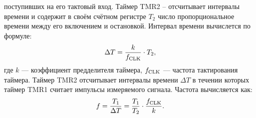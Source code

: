 \documentclass[12pt,a4paper]{article}
\newcommand{\ds}{\displaystyle}
\begin{document}
	поступивших на его тактовый вход. 
	Таймер TMR2 -- отсчитывает интервалы времени и содержит в
	своём счётном регистре $T_2$ число пропорциональное 
	времени между его включением и остановкой. 
	Интервал времени вычислется по формуле: \\
	\begin{equation} 
		\ds \Delta T = \frac{k}{f_{\rm CLK}}\cdot T_2,
	\end{equation}
	где $k$ --- коэффициент предделителя таймера, $f_{\rm CLK}$ ---
	частота тактирования таймера.
	Таймер TMR2 отсчитывает интервалы времени $\Delta T$ в течении которых
	таймер TMR1 считает импульсы измеряемого сигнала. Частота вычисляется
	как:
	\begin{equation} 
		\ds f = \frac{T_1}{\Delta T} = 
		\frac{T_1}{T_2}\cdot\frac{f_{\rm CLK}}{k}.
	\end{equation}
\end{document}
